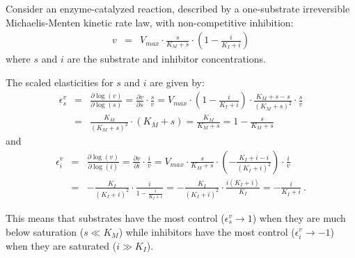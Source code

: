 \documentclass[12pt,a4paper]{article}
\begin{document}
Consider an enzyme-catalyzed reaction, described by a one-substrate irreversible Michaelis-Menten kinetic rate law, with non-competitive inhibition:
\begin{eqnarray}
    v &=& V_{max} \cdot \frac{s}{K_M + s} \cdot \left(1 - \frac{i}{K_I + i}\right)
\end{eqnarray}
where $s$ and $i$ are the substrate and inhibitor concentrations.

The scaled elasticities for $s$ and $i$ are given by:
\begin{eqnarray}
    \epsilon_s^v &=& \frac{\partial \log(v)}{\partial \log(s)} = \frac{\partial v}{\partial s}\cdot\frac{s}{v} = V_{max} \cdot \left(1 - \frac{i}{K_I + i}\right) \cdot \frac{K_M + s - s}{(K_M + s)^2} \cdot \frac{s}{v} \nonumber \\
    &=& \frac{K_M}{(K_M + s)^2} \cdot (K_M + s) = \frac{K_M}{K_M + s} = 1 - \frac{s}{K_M + s}
\end{eqnarray}
and
\begin{eqnarray}
    \epsilon_i^v &=& \frac{\partial \log(v)}{\partial \log(i)} = \frac{\partial v}{\partial i}\cdot\frac{i}{v} = V_{max} \cdot \frac{s}{K_M + s} \cdot \left(-\frac{K_I + i - i}{(K_I + i)^2}\right) \cdot \frac{i}{v} \nonumber \\
    &=& -\frac{K_I}{(K_I + i)^2} \cdot \frac{i}{1 - \frac{i}{K_I + i}} = -\frac{K_I}{(K_I + i)^2} \cdot \frac{i (K_I + i)}{K_I} = -\frac{i}{K_I + i}~.
\end{eqnarray}

This means that substrates have the most control ($\epsilon_s^v \rightarrow 1$) when they are much below saturation ($s \ll K_M$) while inhibitors have the most control ($\epsilon_i^v \rightarrow -1$) when they are saturated ($i \gg K_I$).
\end{document}
